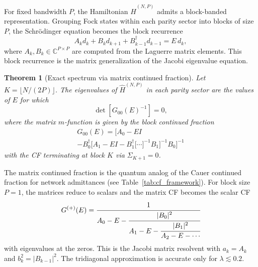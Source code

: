 \documentclass[reprint, floatfix, superscriptaddress, amsmath, amssymb, longbibliography]{revtex4-2}
\newtheorem{theorem}{Theorem}[section]
\begin{document}

For fixed bandwidth $P$, the Hamiltonian $\hat{H}^{(N,P)}$ admits a block-banded representation. Grouping Fock states within each parity sector into blocks of size $P$, the Schr\"odinger equation becomes the block recurrence
\begin{equation}
{A}_k {d}_k + {B}_k {d}_{k+1} + {B}_{k-1}^\dagger {d}_{k-1} = E\, {d}_k,
\label{eq:block_recurrence}
\end{equation}
where ${A}_k, {B}_k \in \mathbb{C}^{P \times P}$ are computed from the Laguerre matrix elements. This block recurrence is the matrix generalization of the Jacobi eigenvalue equation.

\begin{theorem}[Exact spectrum via matrix continued fraction]
\label{thm:exact_block_cf}
Let $K = \lfloor N/(2P) \rfloor$. The eigenvalues of $\hat{H}^{(N,P)}$ in each parity sector are the values of $E$ for which
\begin{equation}
\det[{G}_{00}(E)^{-1}] = 0,
\label{eq:secular_det}
\end{equation}
where the matrix $m$-function is given by the block continued fraction
\begin{multline}
{G}_{00}(E) = \bigl[{A}_0 - E{I} \\
- {B}_0^\dagger \bigl[{A}_1 - E{I} - {B}_1^\dagger \bigl[\cdots\bigr]^{-1} {B}_1\bigr]^{-1} {B}_0\bigr]^{-1}
\label{eq:matrix_cf}
\end{multline}
with the CF terminating at block $K$ via ${\Sigma}_{K+1} = {0}$.
\end{theorem}

The matrix continued fraction is the quantum analog of the Cauer continued fraction for network admittances (see Table~\ref{tab:cf_framework}). For block size $P = 1$, the matrices reduce to scalars and the matrix CF becomes the scalar CF
\begin{equation}
G^{(+)}(E) = \cfrac{1}{A_0 - E - \cfrac{|B_0|^2}{A_1 - E - \cfrac{|B_1|^2}{A_2 - E - \cdots}}}
\label{eq:scalar_cf}
\end{equation}
with eigenvalues at the zeros. This is the Jacobi matrix resolvent with $a_k = A_k$ and $b_k^2 = |B_{k-1}|^2$. The tridiagonal approximation is accurate only for $\lambda \lesssim 0.2$.
\end{document}

